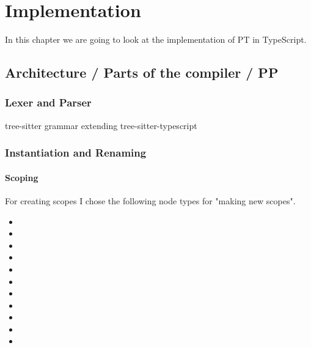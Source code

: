 
\chapter{Implementation}\label{ch:implementation}

In this chapter we are going to look at the implementation of PT in TypeScript.

\section{Architecture / Parts of the compiler / PP}\label{sec:architecture}



\subsection{Lexer and Parser}\label{subsec:lexer-and-parser}

tree-sitter grammar extending tree-sitter-typescript

\subsection{Instantiation and Renaming}\label{subsec:instantiation-and-renaming}

\subsubsection{Scoping}\label{subsubsec:inst-scoping}

For creating scopes I chose the following node types for "making new scopes".

\begin{itemize}
    \item {}
    \item {}
    \item {}
    \item {}
    \item {}
    \item {}
    \item {}
    \item {}
    \item {}
    \item {}
    \item {}
\end{itemize}

